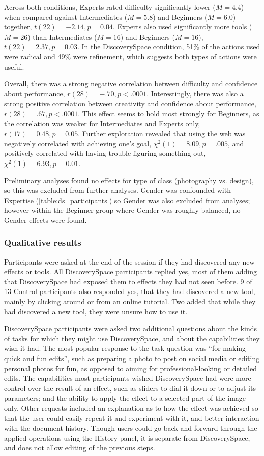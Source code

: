 Across both conditions, Experts rated difficulty significantly lower ($M = 4.4$) when compared against Intermediates ($M = 5.8$) and Beginners ($M = 6.0$) together, $t(22) = -2.14, p = 0.04$. Experts also used significantly more tools ($M = 26$) than Intermediates ($M = 16$) and Beginners ($M = 16$), $t(22) = 2.37, p = 0.03$. In the Discovery\-Space condition, 51\% of the actions used were radical and 49\% were refinement, which suggests both types of actions were useful.

Overall, there was a strong negative correlation between difficulty and confidence about performance, $r(28) = -.70, p < .0001$. Interestingly, there was also a strong positive correlation between creativity and confidence about performance, $r(28) = .67, p < .0001$.  This effect seems to hold most strongly for Beginners, as the correlation was weaker for Intermediates and Experts only, $r(17) = 0.48, p = 0.05$. Further exploration revealed that using the web was negatively correlated with achieving one's goal, $\chi^2(1) = 8.09, p = .005$, and positively correlated with having trouble figuring something out, $\chi^2(1) = 6.93, p = 0.01$.

Preliminary analyses found no effects for type of class (photography vs. design), so this was excluded from further analyses. Gender was confounded with Expertise (\autoref{table:ds_participants}) so Gender was also excluded from analyses; however within the Beginner group where Gender was roughly balanced, no Gender effects were found.

\subsubsection{Qualitative results}
Participants were asked at the end of the session if they had discovered any new effects or tools. All Discovery\-Space participants replied yes, most of them adding that Discovery\-Space had exposed them to effects they had not seen before. 9 of 13 Control participants also responded yes, that they had discovered a new tool, mainly by clicking around or from an online tutorial. Two added that while they had discovered a new tool, they were unsure how to use it.

Discovery\-Space participants were asked two additional questions about the kinds of tasks for which they might use Discovery\-Space, and about the capabilities they wish it had. The most popular response to the task question was ``for making quick and fun edits'', such as preparing a photo to post on social media or editing personal photos for fun, as opposed to aiming for professional-looking or detailed edits. The capabilities most participants wished Discovery\-Space had were more control over the result of an effect, such as sliders to dial it down or to adjust its parameters; and the ability to apply the effect to a selected part of the image only. Other requests included an explanation as to how the effect was achieved so that the user could easily repeat it and experiment with it, and better interaction with the document history. Though users could go back and forward through the applied operations using the History panel, it is separate from Discovery\-Space, and does not allow editing of the previous steps.

